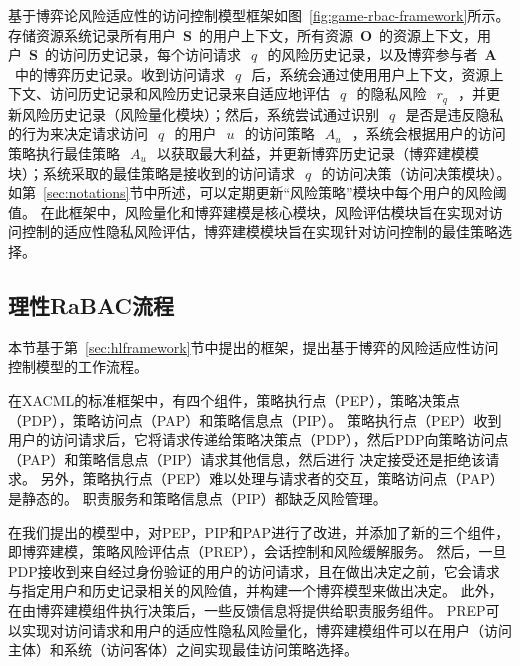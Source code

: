 基于博弈论风险适应性的访问控制模型框架如图~\ref{fig:game-rbac-framework}所示。存储资源系统记录所有用户~$\mathbf{S}$~的用户上下文，所有资源~$\mathbf{O}$~的资源上下文，用户~$\mathbf{S}$~的访问历史记录，每个访问请求~$~q~$~的风险历史记录，以及博弈参与者~$\mathbf{A}$~中的博弈历史记录。收到访问请求~$~q~$~后，系统会通过使用用户上下文，资源上下文、访问历史记录和风险历史记录来自适应地评估~$~q~$~的隐私风险~$~r_q~$~，并更新风险历史记录（风险量化模块）；然后，系统尝试通过识别~$~q~$~是否是违反隐私的行为来决定请求访问~$~q~$~的用户~$~u~$~的访问策略~$~A_u~$~，系统会根据用户的访问策略执行最佳策略~$~A_u~$~以获取最大利益，并更新博弈历史记录（博弈建模模块）；系统采取的最佳策略是接收到的访问请求~$~q~$~的访问决策（访问决策模块）。如第~\ref{sec:notations}节中所述，可以定期更新“风险策略”模块中每个用户的风险阈值。
在此框架中，风险量化和博弈建模是核心模块，风险评估模块旨在实现对访问控制的适应性隐私风险评估，博弈建模模块旨在实现针对访问控制的最佳策略选择。


\subsection{理性RaBAC流程}


本节基于第~\ref{sec:hlframework}节中提出的框架，提出基于博弈的风险适应性访问控制模型的工作流程。

在XACML的标准框架中，有四个组件，策略执行点（PEP），策略决策点（PDP），策略访问点（PAP）和策略信息点（PIP）。 策略执行点（PEP）收到用户的访问请求后，它将请求传递给策略决策点（PDP），然后PDP向策略访问点（PAP）和策略信息点（PIP）请求其他信息，然后进行 决定接受还是拒绝该请求。 另外，策略执行点（PEP）难以处理与请求者的交互，策略访问点（PAP）是静态的。 职责服务和策略信息点（PIP）都缺乏风险管理。


在我们提出的模型中，对PEP，PIP和PAP进行了改进，并添加了新的三个组件，即博弈建模，策略风险评估点（PREP），会话控制和风险缓解服务。 然后，一旦PDP接收到来自经过身份验证的用户的访问请求，且在做出决定之前，它会请求与指定用户和历史记录相关的风险值，并构建一个博弈模型来做出决定。 此外，在由博弈建模组件执行决策后，一些反馈信息将提供给职责服务组件。 PREP可以实现对访问请求和用户的适应性隐私风险量化，博弈建模组件可以在用户（访问主体）和系统（访问客体）之间实现最佳访问策略选择。

